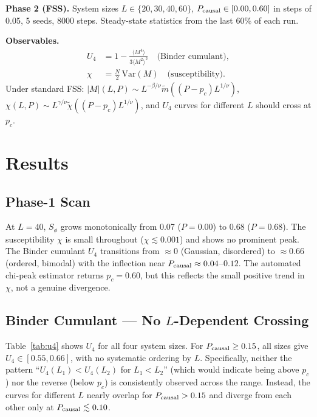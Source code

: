 \documentclass[12pt,a4paper]{article}
\begin{document}
\textbf{Phase 2 (FSS).} System sizes $L \in \{20, 30, 40, 60\}$,
$P_{\rm causal} \in [0.00, 0.60]$ in steps of 0.05,
5 seeds, 8000 steps.
Steady-state statistics from the last 60\% of each run.

\textbf{Observables.}
\begin{align}
  U_4 &= 1 - \frac{\langle M^4 \rangle}{3 \langle M^2 \rangle^2}
  \quad\text{(Binder cumulant)},\\
  \chi &= \frac{N}{2} \,\mathrm{Var}(M)
  \quad\text{(susceptibility)}.
\end{align}
Under standard FSS:
$|M|(L, P) \sim L^{-\beta/\nu} \tilde{m}((P - p_c) L^{1/\nu})$,
$\chi(L, P) \sim L^{\gamma/\nu} \tilde{\chi}((P - p_c) L^{1/\nu})$,
and $U_4$ curves for different $L$ should cross at $p_c$.

\section{Results}
\label{sec:results}

\subsection{Phase-1 Scan}

At $L = 40$, $S_\phi$ grows monotonically from 0.07 ($P = 0.00$) to 0.68 ($P = 0.68$).
The susceptibility $\chi$ is small throughout ($\chi \lesssim 0.001$) and shows
no prominent peak.
The Binder cumulant $U_4$ transitions from $\approx 0$ (Gaussian, disordered)
to $\approx 0.66$ (ordered, bimodal) with the inflection near $P_{\rm causal} \approx 0.04$--$0.12$.
The automated chi-peak estimator returns $p_c = 0.60$, but this reflects
the small positive trend in $\chi$, not a genuine divergence.

\subsection{Binder Cumulant — No $L$-Dependent Crossing}

Table~\ref{tab:u4} shows $U_4$ for all four system sizes.
For $P_{\rm causal} \geq 0.15$, all sizes give $U_4 \in [0.55, 0.66]$,
with no systematic ordering by $L$.
Specifically, neither the pattern ``$U_4(L_1) < U_4(L_2)$ for $L_1 < L_2$''
(which would indicate being above $p_c$) nor the reverse (below $p_c$) is
consistently observed across the range.
Instead, the curves for different $L$ nearly overlap for $P_{\rm causal} > 0.15$
and diverge from each other only at $P_{\rm causal} \lesssim 0.10$.
\end{document}
